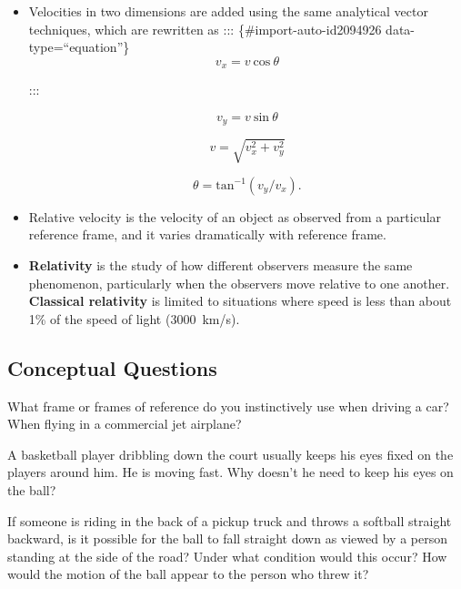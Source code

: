 \documentclass[
]{book}
\begin{document}
\begin{itemize}
\item
  \protect\hypertarget{import-auto-id2094922}{}{Velocities in two dimensions are added using the same analytical
  vector techniques, which are rewritten as}
  ::: \{\#import-auto-id2094926 data-type=``equation''\}
  \[{{v_{x} = v\ }\text{cos}\ \theta}{}\]

  :::

  \leavevmode{}%
  \[{{v_{y} = v\ }\text{sin}\ \theta}{}\]

  \leavevmode{}%
  \[{v = \sqrt{v_{x}^{2} + v_{y}^{2}}}{}\]

  \leavevmode{}%
  \[{{\theta = \text{tan}^{- 1}}({v_{y}/v_{x}})}{}.\]
\item
  \protect\hypertarget{import-auto-id1847577}{}{Relative velocity is the velocity of an object as observed from a
  particular reference frame, and it varies dramatically with
  reference frame.}
\item
  \protect\hypertarget{import-auto-id1847580}{}{\textbf{Relativity} is the study of how different observers measure the
  same phenomenon, particularly when the observers move relative to
  one another. \textbf{Classical relativity} is limited to situations where
  speed is less than about 1\% of the speed of light
  (3000~km/s).}
\end{itemize}

\hypertarget{fs-id1894444}{}
\hypertarget{conceptual-questions-10}{%
\subsection{Conceptual Questions}\label{conceptual-questions-10}}

\hypertarget{fs-id1125168}{}
\leavevmode{}%
What frame or frames of reference do you instinctively use when driving
a car? When flying in a commercial jet airplane?

\hypertarget{fs-id1462868}{}
\leavevmode{}%
A basketball player dribbling down the court usually keeps his eyes
fixed on the players around him. He is moving fast. Why doesn't he need
to keep his eyes on the ball?

\hypertarget{fs-id1635072}{}
\leavevmode{}%
If someone is riding in the back of a pickup truck and throws a softball
straight backward, is it possible for the ball to fall straight down as
viewed by a person standing at the side of the road? Under what
condition would this occur? How would the motion of the ball appear to
the person who threw it?
\end{document}
